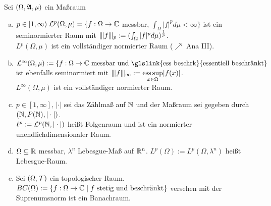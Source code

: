 \documentclass[ngerman]{report}
\begin{document}
\begin{bsp}
	Sei $(\Omega,\mathfrak{A},\mu)$ ein Maßraum
		\begin{enumerate}[(a)]
			\item $p\in[1,\infty)\; \mathcal{L}^p(\Omega,\mu) = \{f:\Omega \rightarrow \mathbb{C}$ messbar, 
						$\int_\Omega |f|^p d\mu < \infty \}$ ist ein seminormierter Raum mit 
						$\interleave{f}\interleave_p := (\int_\Omega |f|^p d\mu )^{\frac{1}{p}}$.\\
						$L^p(\Omega,\mu)$ ist ein vollständiger normierter Raum ($\nearrow$ Ana III).

			\item $\hL^\infty(\Omega,\mu) := \{f:\Omega \rightarrow \C 
						\text{ messbar und \glslink{ess beschrk}{essentiell beschränkt} }$ ist ebenfalls seminormiert mit 
						$\interleave{f}\interleave_\infty := \underset{x\in\Omega}{\textnormal{ess} \sup} |f(x)|$.\\
						$L^\infty(\Omega,\mu)$ ist ein vollständiger normierter Raum.

			\item $p\in [1,\infty],\, |\cdot|$ sei das Zählmaß auf $\mathbb{N}$ und der Maßraum sei gegeben durch 
						$(\mathbb{N}, P(\mathbb{N}), |\cdot|)$.\\
						$\ell^p := \mathcal{L}^p(\mathbb{N}, |\cdot|)$ heißt Folgenraum und ist ein normierter unendlichdimensionaler Raum.

			\item $\Omega \subseteq \mathbb{R}$ messbar, $\lambda^n$ Lebesgue-Maß auf $\mathbb{R}^n$.
						$L^p(\Omega) := L^p(\Omega,\lambda^n)$ heißt Lebesgue-Raum.

			\item Sei $(\Omega, \mathcal{T})$ ein topologischer Raum. 
						$BC(\Omega) := \{ f: \Omega \rightarrow \mathbb{C}\;|\;f 
						\text{ stetig und beschränkt} \}$ versehen mit der Suprenumsnorm ist ein Banachraum.
	\end{enumerate}
\end{bsp}
\end{document}

